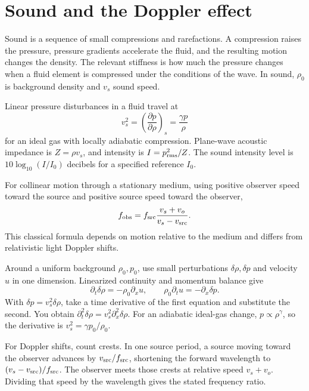 \documentclass[11pt,oneside]{book}
\newcommand{\pd}[2]{\frac{\partial #1}{\partial #2}}
\theoremstyle{reviewstyle}
\begin{document}
\section{Sound and the Doppler effect}
Sound is a sequence of small compressions and rarefactions. A compression raises the pressure, pressure gradients accelerate the fluid, and the resulting motion changes the density. The relevant stiffness is how much the pressure changes when a fluid element is compressed under the conditions of the wave. In sound, $\rho_0$ is background density and $v_s$ sound speed.

Linear pressure disturbances in a fluid travel at
\begin{equation}
v_s^2=\left(\pd{p}{\rho}\right)_s=\frac{\gamma p}{\rho}
\end{equation}
for an ideal gas with locally adiabatic compression. Plane-wave acoustic impedance is $Z=\rho v_s$, and intensity is $I=p_{\rm rms}^2/Z$. The sound intensity level is $10\log_{10}(I/I_0)$ decibels for a specified reference $I_0$.

For collinear motion through a stationary medium, using positive observer speed toward the source and positive source speed toward the observer,
\begin{equation}f_{\rm obs}=f_{\rm src}\frac{v_s+v_o}{v_s-v_{\rm src}}.\end{equation}
This classical formula depends on motion relative to the medium and differs from relativistic light Doppler shifts.

Around a uniform background $\rho_0,p_0$, use small perturbations $\delta\rho,\delta p$ and velocity $u$ in one dimension. Linearized continuity and momentum balance give
\begin{equation}
\partial_t\delta\rho=-\rho_0\partial_xu,\qquad
\rho_0\partial_tu=-\partial_x\delta p.
\end{equation}
With $\delta p=v_s^2\delta\rho$, take a time derivative of the first equation and substitute the second. You obtain $\partial_t^2\delta\rho=v_s^2\partial_x^2\delta\rho$. For an adiabatic ideal-gas change, $p\propto\rho^\gamma$, so the derivative is $v_s^2=\gamma p_0/\rho_0$.

For Doppler shifts, count crests. In one source period, a source moving toward the observer advances by $v_{\rm src}/f_{\rm src}$, shortening the forward wavelength to $(v_s-v_{\rm src})/f_{\rm src}$. The observer meets those crests at relative speed $v_s+v_o$. Dividing that speed by the wavelength gives the stated frequency ratio.
\end{document}
